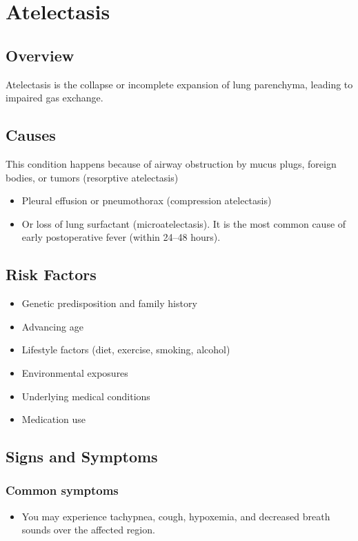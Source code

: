 \chapter{Atelectasis}
\label{sec:Atelectasis}

\section{Overview}
Atelectasis is the collapse or incomplete expansion of lung parenchyma, leading to impaired gas exchange.
\section{Causes}
This condition happens because of airway obstruction by mucus plugs, foreign bodies, or tumors (resorptive atelectasis)

\begin{itemize}[noitemsep]
  \item Pleural effusion or pneumothorax (compression atelectasis)
  \item Or loss of lung surfactant (microatelectasis). It is the most common cause of early postoperative fever (within 24--48 hours).
\end{itemize}
\section{Risk Factors}


\begin{itemize}[noitemsep]
  \item Genetic predisposition and family history
  \item Advancing age
  \item Lifestyle factors (diet, exercise, smoking, alcohol)
  \item Environmental exposures
  \item Underlying medical conditions
  \item Medication use
\end{itemize}
\section{Signs and Symptoms}

\subsection{Common symptoms}
\begin{itemize}[noitemsep]
  \item You may experience tachypnea, cough, hypoxemia, and decreased breath sounds over the affected region. 
  \end{itemize}

